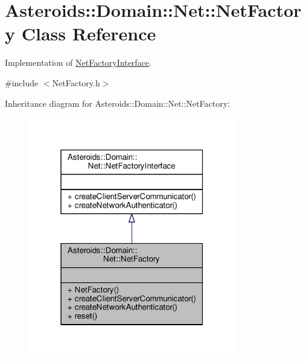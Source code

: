 \hypertarget{classAsteroids_1_1Domain_1_1Net_1_1NetFactory}{}\section{Asteroids\+:\+:Domain\+:\+:Net\+:\+:Net\+Factory Class Reference}
\label{classAsteroids_1_1Domain_1_1Net_1_1NetFactory}


Implementation of \hyperlink{classAsteroids_1_1Domain_1_1Net_1_1NetFactoryInterface}{Net\+Factory\+Interface}.  




{\ttfamily \#include $<$Net\+Factory.\+h$>$}



Inheritance diagram for Asteroids\+:\+:Domain\+:\+:Net\+:\+:Net\+Factory\+:\nopagebreak
\begin{figure}[H]
\begin{center}
\leavevmode
\includegraphics[width=256pt]{classAsteroids_1_1Domain_1_1Net_1_1NetFactory__inherit__graph}
\end{center}
\end{figure}


